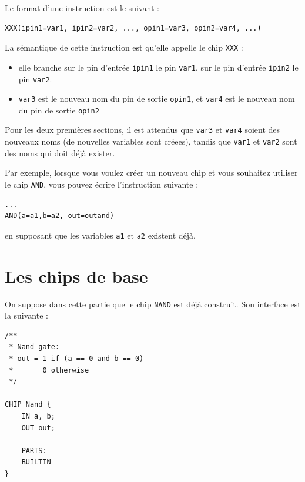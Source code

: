 \documentclass[11pt]{article}
\begin{document}
Le format d'une instruction est le suivant :
\begin{verbatim}
XXX(ipin1=var1, ipin2=var2, ..., opin1=var3, opin2=var4, ...)
\end{verbatim}

La sémantique de cette instruction est qu'elle appelle le chip \texttt{XXX} :
\begin{itemize}
\item elle branche sur le pin d'entrée \texttt{ipin1} le pin \texttt{var1}, sur le pin d'entrée \texttt{ipin2} le pin \texttt{var2}.
\item \texttt{var3} est le nouveau nom du pin de sortie \texttt{opin1}, et \texttt{var4} est le nouveau nom du pin de sortie \texttt{opin2}
\end{itemize}

Pour les deux premières sections, il est attendus que \texttt{var3} et \texttt{var4} soient des nouveaux noms (de nouvelles variables sont créees), tandis que \texttt{var1} et \texttt{var2} sont des noms qui doit déjà exister.

Par exemple, lorsque vous voulez créer un nouveau chip et vous souhaitez utiliser le chip \texttt{AND}, vous pouvez écrire l'instruction suivante :
\begin{verbatim}
...
AND(a=a1,b=a2, out=outand)
\end{verbatim}

en supposant que les variables \texttt{a1} et \texttt{a2} existent déjà.

\section{Les chips de base}
\label{sec:base}
On suppose dans cette partie que le chip \texttt{NAND} est déjà construit. Son interface est la suivante :
\begin{verbatim}
/**
 * Nand gate:
 * out = 1 if (a == 0 and b == 0)
 *       0 otherwise
 */

CHIP Nand {
    IN a, b;
    OUT out;

    PARTS:
    BUILTIN
}
\end{verbatim}
\end{document}
